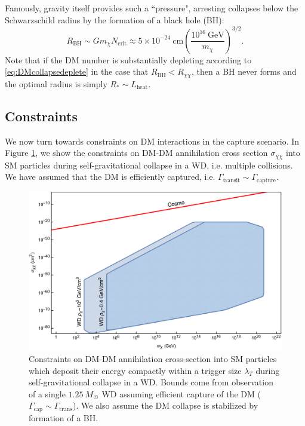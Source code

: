 \documentclass[preprintnumbers,amsmath,amssymb,prd,superscriptaddress]{revtex4}
\newcommand{\GeV}{\text{GeV}}
\newcommand{\cm}{\text{cm}}
\def\r{\right)}
\def\l{\left(}
\begin{document}
Famously, gravity itself provides such a ``pressure", arresting collapses below the Schwarzschild radius by the formation of a black hole (BH):
\begin{equation}
R_\text{BH} \sim G m_\chi N_\text{crit} \approx 5 \times 10^{-24} ~\cm \l \frac{10^{16} ~\GeV}{m_\chi} \r^{3/2}.
\end{equation}
Note that if the DM number is substantially depleting according to \eqref{eq:DMcollapsedeplete} in the case that $R_\text{BH} < R_{\chi \chi}$, then a BH never forms and the optimal radius is simply $R_* \sim L_\text{heat}$. 

\subsection{Constraints}

We now turn towards constraints on DM interactions in the capture scenario. 
In Figure \ref{fig:multicapture}, we show the constraints on DM-DM annihilation cross section $\sigma_{\chi \chi}$ into SM particles during self-gravitational collapse in a WD, i.e. multiple collisions.
We have assumed that the DM is efficiently captured, i.e. $\Gamma_\text{transit} \sim \Gamma_\text{capture}$. 
\begin{figure}
\includegraphics[scale=.35]{multicapture.pdf}
\caption{Constraints on DM-DM annihilation cross-section into SM particles which deposit their energy compactly within a trigger size $\lambda_T$ during self-gravitational collapse in a WD. Bounds come from observation of a single $1.25~M_{\astrosun}$ WD assuming efficient capture of the DM ($\Gamma_\text{cap} \sim \Gamma_\text{trans}$). We also assume the DM collapse is stabilized by formation of a BH.}
\label{fig:multicapture}
\end{figure}
\end{document}
